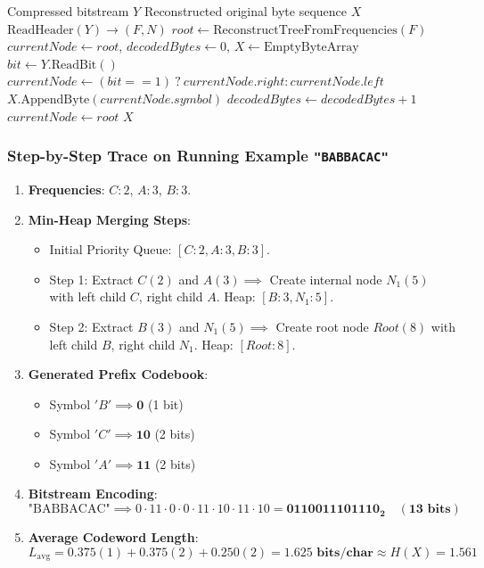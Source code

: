 \documentclass[12pt,a4paper]{article}
\begin{document}
\begin{algorithm}[H]
\caption{Huffman Bitstream Decoding}
\begin{algorithmic}[1]
\Require Compressed bitstream $Y$
\Ensure Reconstructed original byte sequence $X$
\State $\text{ReadHeader}(Y) \to (F, N)$
\State $root \gets \text{ReconstructTreeFromFrequencies}(F)$
\State $currentNode \gets root$, $decodedBytes \gets 0$, $X \gets \text{EmptyByteArray}$
    \State $bit \gets Y.\text{ReadBit}()$
    \State $currentNode \gets (bit == 1) \ ? \ currentNode.right : currentNode.left$
        \State $X.\text{AppendByte}(currentNode.symbol)$
        \State $decodedBytes \gets decodedBytes + 1$
        \State $currentNode \gets root$
    \EndIf
\EndWhile
\State \Return $X$
\end{algorithmic}
\end{algorithm}

\subsubsection{Step-by-Step Trace on Running Example \texttt{"BABBACAC"}}
\begin{enumerate}
    \item \textbf{Frequencies}: $C: 2$, $A: 3$, $B: 3$.
    \item \textbf{Min-Heap Merging Steps}:
    \begin{itemize}
        \item Initial Priority Queue: $[C:2, A:3, B:3]$.
        \item Step 1: Extract $C(2)$ and $A(3) \implies$ Create internal node $N_1(5)$ with left child $C$, right child $A$. Heap: $[B:3, N_1:5]$.
        \item Step 2: Extract $B(3)$ and $N_1(5) \implies$ Create root node $Root(8)$ with left child $B$, right child $N_1$. Heap: $[Root:8]$.
    \end{itemize}
    \item \textbf{Generated Prefix Codebook}:
    \begin{itemize}
        \item Symbol $'B' \implies \mathbf{0}$ (1 bit)
        \item Symbol $'C' \implies \mathbf{10}$ (2 bits)
        \item Symbol $'A' \implies \mathbf{11}$ (2 bits)
    \end{itemize}
    \item \textbf{Bitstream Encoding}:
    \begin{equation*}
    \text{"BABBACAC"} \implies 0 \cdot 11 \cdot 0 \cdot 0 \cdot 11 \cdot 10 \cdot 11 \cdot 10 = \mathbf{0110011101110_2} \quad (\mathbf{13\text{ bits}})
    \end{equation*}
    \item \textbf{Average Codeword Length}:
    \begin{equation*}
    L_{\text{avg}} = 0.375(1) + 0.375(2) + 0.250(2) = \mathbf{1.625\text{ bits/char}} \approx H(X) = 1.561
    \end{equation*}
\end{enumerate}
\end{document}
